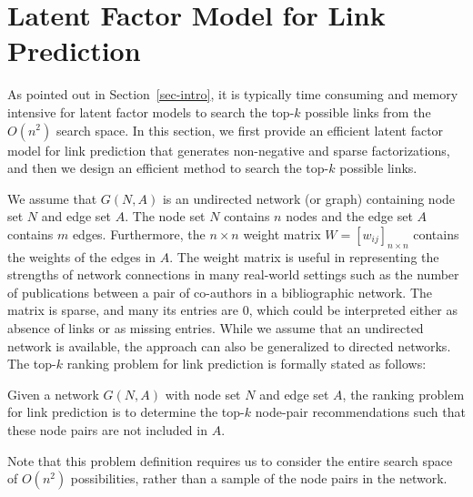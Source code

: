 \section{Latent Factor Model for Link Prediction}
\label{sec-NMF}

As pointed out in Section~\ref{sec-intro},  it is typically time consuming and memory intensive for latent factor models to search the top-$k$ possible links from the $O(n^2)$ search space. In this section, we first provide an efficient latent factor model for link prediction that generates non-negative and sparse
factorizations, and then we design an efficient method to search the top-$k$ possible
links.




We assume that $G(N, A)$ is an undirected network (or graph) containing node set $N$ and
edge set $A$. The node set $N$ contains $n$ nodes and the edge set
$A$ contains $m$ edges. Furthermore, the $n \times n$ weight matrix
$W= [w_{ij}]_{n\times n}$ contains the weights of the edges in $A$.
The weight matrix is useful in representing the strengths of network
connections in  many real-world settings such as the number of
publications between a pair of co-authors in a bibliographic
network.  The matrix is sparse, and many its entries are 0, which could be
interpreted either as absence of links or as missing entries. While
we assume that an undirected network is available, the approach can
also be generalized to directed networks.
%
 The top-$k$ ranking problem for link prediction is formally stated as follows:

\begin{definition}
Given a network $G(N, A)$ with node set $N$ and edge set $A$, the ranking problem for link
prediction is to determine the top-$k$ node-pair recommendations such that these node pairs are not included in $A$.
\end{definition}
Note that this problem definition requires us to consider the entire
search space of $O(n^2)$ possibilities, rather than a sample of the
node pairs in the network.

